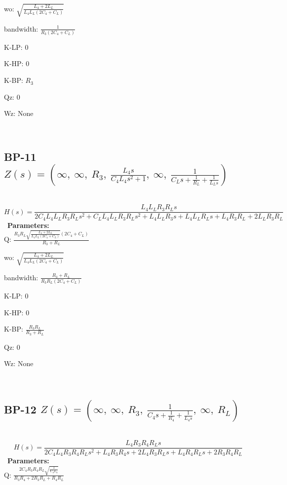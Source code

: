 \documentclass{article}
\begin{document}
wo: $\sqrt{\frac{L_{4} + 2 L_{L}}{L_{4} L_{L} \left(2 C_{4} + C_{L}\right)}}$\ 

bandwidth: $\frac{1}{R_{3} \left(2 C_{4} + C_{L}\right)}$\ 

K-LP: $0$\ 

K-HP: $0$\ 

K-BP: $R_{3}$\ 

Qz: $0$\ 

Wz: $\text{None}$\ 

\ 

\subsection{BP-11 $Z(s) = \left( \infty, \  \infty, \  R_{3}, \  \frac{L_{4} s}{C_{4} L_{4} s^{2} + 1}, \  \infty, \  \frac{1}{C_{L} s + \frac{1}{R_{L}} + \frac{1}{L_{L} s}}\right)$ } \ 
\textbf{\[H(s) = \frac{L_{4} L_{L} R_{3} R_{L} s}{2 C_{4} L_{4} L_{L} R_{3} R_{L} s^{2} + C_{L} L_{4} L_{L} R_{3} R_{L} s^{2} + L_{4} L_{L} R_{3} s + L_{4} L_{L} R_{L} s + L_{4} R_{3} R_{L} + 2 L_{L} R_{3} R_{L}}\] } \ 
\textbf{Parameters:}\\ 

Q: $\frac{R_{3} R_{L} \sqrt{\frac{L_{4} + 2 L_{L}}{L_{4} L_{L} \left(2 C_{4} + C_{L}\right)}} \left(2 C_{4} + C_{L}\right)}{R_{3} + R_{L}}$\ 

wo: $\sqrt{\frac{L_{4} + 2 L_{L}}{L_{4} L_{L} \left(2 C_{4} + C_{L}\right)}}$\ 

bandwidth: $\frac{R_{3} + R_{L}}{R_{3} R_{L} \left(2 C_{4} + C_{L}\right)}$\ 

K-LP: $0$\ 

K-HP: $0$\ 

K-BP: $\frac{R_{3} R_{L}}{R_{3} + R_{L}}$\ 

Qz: $0$\ 

Wz: $\text{None}$\ 

\ 

\subsection{BP-12 $Z(s) = \left( \infty, \  \infty, \  R_{3}, \  \frac{1}{C_{4} s + \frac{1}{R_{4}} + \frac{1}{L_{4} s}}, \  \infty, \  R_{L}\right)$ } \ 
\textbf{\[H(s) = \frac{L_{4} R_{3} R_{4} R_{L} s}{2 C_{4} L_{4} R_{3} R_{4} R_{L} s^{2} + L_{4} R_{3} R_{4} s + 2 L_{4} R_{3} R_{L} s + L_{4} R_{4} R_{L} s + 2 R_{3} R_{4} R_{L}}\] } \ 
\textbf{Parameters:}\\ 

Q: $\frac{2 C_{4} R_{3} R_{4} R_{L} \sqrt{\frac{1}{C_{4} L_{4}}}}{R_{3} R_{4} + 2 R_{3} R_{L} + R_{4} R_{L}}$\ 
\end{document}
